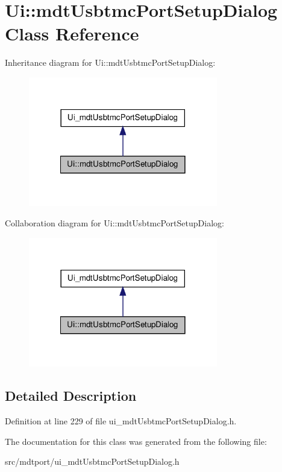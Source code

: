 \hypertarget{class_ui_1_1mdt_usbtmc_port_setup_dialog}{
\section{Ui::mdtUsbtmcPortSetupDialog Class Reference}
\label{class_ui_1_1mdt_usbtmc_port_setup_dialog}
}


Inheritance diagram for Ui::mdtUsbtmcPortSetupDialog:\nopagebreak
\begin{figure}[H]
\begin{center}
\leavevmode
\includegraphics[width=234pt]{class_ui_1_1mdt_usbtmc_port_setup_dialog__inherit__graph}
\end{center}
\end{figure}


Collaboration diagram for Ui::mdtUsbtmcPortSetupDialog:\nopagebreak
\begin{figure}[H]
\begin{center}
\leavevmode
\includegraphics[width=234pt]{class_ui_1_1mdt_usbtmc_port_setup_dialog__coll__graph}
\end{center}
\end{figure}


\subsection{Detailed Description}


Definition at line 229 of file ui\_\-mdtUsbtmcPortSetupDialog.h.



The documentation for this class was generated from the following file:\begin{DoxyCompactItemize}
\item 
src/mdtport/ui\_\-mdtUsbtmcPortSetupDialog.h\end{DoxyCompactItemize}
